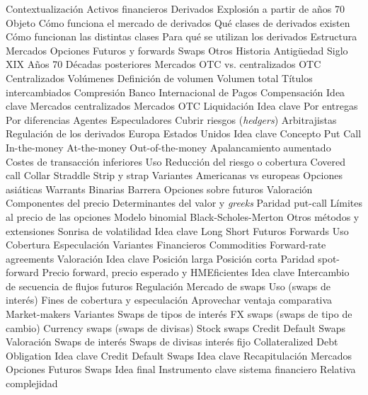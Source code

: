 \documentclass{nuevotema}
\begin{document}
\begin{esquema}[enumerate]
	\1[] 
		\2 Contextualización
			\3 Activos financieros
			\3 Derivados
			\3 Explosión a partir de años 70
		\2 Objeto
			\3 Cómo funciona el mercado de derivados
			\3 Qué clases de derivados existen
			\3 Cómo funcionan las distintas clases
			\3 Para qué se utilizan los derivados
		\2 Estructura
			\3 Mercados
			\3 Opciones
			\3 Futuros y forwards
			\3 Swaps
			\3 Otros
	\1 
		\2 Historia
			\3 Antigüedad
			\3 Siglo XIX
			\3 Años 70
			\3 Décadas posteriores
		\2 Mercados OTC vs. centralizados
			\3 OTC
			\3 Centralizados
		\2 Volúmenes
			\3 Definición de volumen
			\3 Volumen total
			\3 Títulos intercambiados
			\3 Compresión
			\3 Banco Internacional de Pagos
		\2 Compensación
			\3 Idea clave
			\3 Mercados centralizados
			\3 Mercados OTC
		\2 Liquidación
			\3 Idea clave
			\3 Por entregas
			\3 Por diferencias
		\2 Agentes
			\3 Especuladores
			\3 Cubrir riesgos (\textit{hedgers})
			\3 Arbitrajistas
		\2 Regulación de los derivados
			\3 Europa
			\3 Estados Unidos
	\1 
		\2 Idea clave
			\3 Concepto
			\3 Put
			\3 Call
			\3 In-the-money
			\3 At-the-money
			\3 Out-of-the-money
			\3 Apalancamiento aumentado
			\3 Costes de transacción inferiores
		\2 Uso
			\3 Reducción del riesgo o cobertura
			\3 Covered call
			\3 Collar
			\3 Straddle
			\3 Strip y strap
		\2 Variantes
			\3 Americanas vs europeas
			\3 Opciones asiáticas
			\3 Warrants
			\3 Binarias
			\3 Barrera
			\3 Opciones sobre futuros
		\2 Valoración
			\3 Componentes del precio
			\3 Determinantes del valor y \textit{greeks}
			\3 Paridad put-call
			\3 Límites al precio de las opciones
			\3 Modelo binomial
			\3 Black-Scholes-Merton
			\3 Otros métodos y extensiones
			\3 Sonrisa de volatilidad
	\1 
		\2 Idea clave
			\3 Long
			\3 Short
			\3 Futuros
			\3 Forwards
		\2 Uso
			\3 Cobertura
			\3 Especulación
		\2 Variantes
			\3 Financieros
			\3 Commodities
			\3 Forward-rate agreements
		\2 Valoración
			\3 Idea clave
			\3 Posición larga
			\3 Posición corta
			\3 Paridad spot-forward
			\3 Precio forward, precio esperado y HMEficientes
	\1 
		\2 Idea clave
			\3 Intercambio de secuencia de flujos futuros
			\3 Regulación
			\3 Mercado de swaps
		\2 Uso (swaps de interés)
			\3 Fines de cobertura y especulación
			\3 Aprovechar ventaja comparativa
			\3 Market-makers
		\2 Variantes
			\3 Swaps de tipos de interés
			\3 FX swaps (swaps de tipo de cambio)
			\3 Currency swaps (swaps de divisas)
			\3 Stock swaps
			\3 Credit Default Swaps
		\2 Valoración
			\3 Swaps de interés
			\3 Swaps de divisas interés fijo
	\1 
		\2 Collateralized Debt Obligation
			\3 Idea clave
		\2 Credit Default Swaps
			\3 Idea clave
	\1[] 
		\2 Recapitulación
			\3 Mercados
			\3 Opciones
			\3 Futuros
			\3 Swaps
		\2 Idea final
			\3 Instrumento clave sistema financiero
			\3 Relativa complejidad

\end{esquema}
\end{document}
